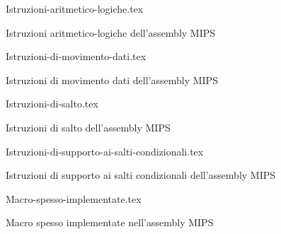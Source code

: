 \documentclass[class=book, crop=false]{standalone}
\begin{document}
\begin{table}[H]
	\centering
	{Istruzioni-aritmetico-logiche.tex}
	\caption{Istruzioni aritmetico-logiche dell'assembly MIPS}
\end{table}

\begin{table}[H]
	\centering
	{Istruzioni-di-movimento-dati.tex}
	\caption{Istruzioni di movimento dati dell'assembly MIPS}
\end{table}

\begin{table}[H]
	\centering
	{Istruzioni-di-salto.tex}
	\caption{Istruzioni di salto dell'assembly MIPS}
\end{table}

\begin{table}[H]
	\centering
	{Istruzioni-di-supporto-ai-salti-condizionali.tex}
	\caption{Istruzioni di supporto ai salti condizionali dell'assembly MIPS}
\end{table}

\begin{table}[H]
	\centering
	{Macro-spesso-implementate.tex}
	\caption{Macro spesso implementate nell'assembly MIPS}
\end{table}
\end{document}
